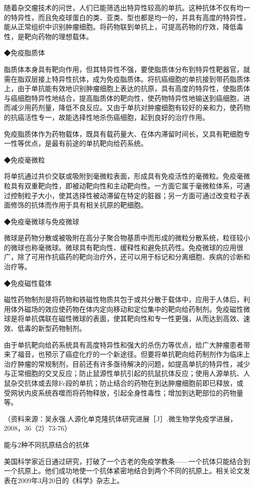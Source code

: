 随着杂交瘤技术的问世，人们已能筛选出特异性较高的单抗。这种抗体不仅有均一的特异性，而且免疫球蛋白的类、亚类、型也都是均一的，并具有高度的特异性，能从正常组织中识别肿瘤细胞。将药物联到单抗上，可提高药物的疗效，降低毒性，是靶向药物的理想载体。

◆免疫脂质体

脂质体本身具有靶向作用，但其特异性不强，要使脂质体分布到特异性靶器官，就需在脂双层接上特异性抗体，成为免疫脂质体。将抗癌细胞的单抗接到带药脂质体上，由于单抗能有效地识别肿瘤细胞上表达的抗原，具有高度的特异性，使脂质体与癌细胞特异性地结合，提高脂质体的靶向性，使药物特异性地输送到癌细胞，进而减少用药剂量，降低不良反应。又由于单抗对肿瘤细胞有较好的亲和力，使药物的抗癌活性专一，故能选择性地杀伤癌细胞，起到良好的治疗作用。

免疫脂质体作为药物载体，既具有载药量大、在体内滞留时间长，又具有靶细胞专一性等优点，是最有前途的单抗靶向给药系统。

◆免疫毫微粒

将单抗通过共价交联或吸附到毫微粒表面，形成具有免疫活性的毫微粒。免疫毫微粒具有双重靶向性，即被动靶向性和主动靶向性。一方面它属于毫微粒体系，可通过控制粒子大小，使其选择性被动滞留在特定的脏器；另一方面可通过改变粒子表面修饰的抗体而作用于具有相关抗原的靶细胞。

◆免疫毫微球与免疫微球

微球是药物分散或被吸附在高分子聚合物基质中而形成的微粒分散系统，粒径较小的微球也称毫微球。微球具有靶向性、缓释性和避免抗药性。免疫微球的应用很广，除了可用作抗癌药的靶向治疗外，还可以用于标记和分离细胞、疾病的诊断和治疗等。

◆免疫磁性载体

磁性药物制剂是将药物和铁磁性物质共包于或共分散于载体中，应用于人体后，利用体外磁场的效应使药物在体内定向移动和定位集中的靶向给药制剂。免疫磁性微球是将单抗偶联在磁性微球的表面，使其靶向性和专一性更强，从而达到高效、速效、低毒的新型药物制剂。

由于单抗靶向给药系统具有高度特异性和强大的杀伤力等优点，给广大肿瘤患者带来了福音，也预示了癌症化疗的一个新途径。但要将单抗靶向给药制剂作为临床上治疗肿瘤的常规制剂，目前还有许多亟待解决的问题，如提高单抗的特异性，减少与正常细胞的交叉反应；防止鼠源性单抗引起的抗鼠抗体反应；使用人源单抗、人鼠杂交抗体或去除Fc段的单抗；防止结合的药物在到达肿瘤细胞前即已释放，或受网状内皮系统吞噬而将药物释放，引起全身性毒性；增加到达靶部位的药物量等。

（资料来源：吴永强.人源化单克隆抗体研究进展［J］.微生物学免疫学进展，2008，36（2）73-76）

\begin{center}
{\Large 能与2种不同抗原结合的抗体}
\end{center}
美国科学家近日通过研究，打破了一个古老的免疫学教条------一个抗体只能结合到一个抗原上。他们成功地使一个抗体紧密地结合到两个不同的抗原上。相关论文发表在2009年3月20日的《科学》杂志上。

